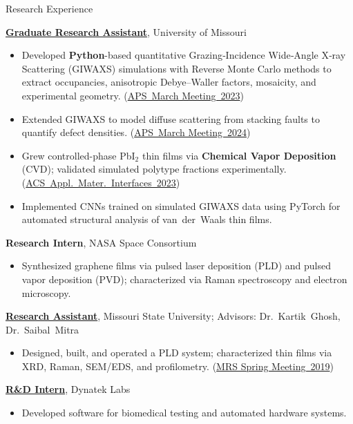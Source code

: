 \begin{rubric}{Research Experience}

  \entry*[2021--Present]%
  \textbf{\href{https://physics.missouri.edu/news/celebrating-student-awards-scholarships-and-recognition}{Graduate Research Assistant}}, University of Missouri%
  \begin{itemize}
    \item Developed \textbf{Python}-based quantitative Grazing‑Incidence Wide‑Angle X‑ray Scattering (GIWAXS) simulations with Reverse Monte Carlo methods to extract occupancies, anisotropic Debye–Waller factors, mosaicity, and experimental geometry. (\href{https://www.researchgate.net/publication/377264935_Quantifying_Orientational_Order_of_PbI2_van_der_Waals_Films_with_X-ray_Diffraction_using_an_Area_Detector}{APS March Meeting 2023})
    \item Extended GIWAXS to model diffuse scattering from stacking faults to quantify defect densities. (\href{https://meetings.aps.org/Meeting/MAR24/Session/S64.3}{APS March Meeting 2024})
    \item Grew controlled-phase PbI$_2$ thin films via \textbf{Chemical Vapor Deposition} (CVD); validated simulated polytype fractions experimentally. (\href{https://doi.org/10.1021/acsami.3c14559}{ACS Appl. Mater. Interfaces 2023})
    \item Implemented CNNs trained on simulated GIWAXS data using PyTorch for automated structural analysis of van der Waals thin films. 
  \end{itemize}

  \entry*[2019--2020]%
  \textbf{Research Intern}, NASA Space Consortium%
  \begin{itemize}
    \item Synthesized graphene films via pulsed laser deposition (PLD) and pulsed vapor deposition (PVD); characterized via Raman spectroscopy and electron microscopy.
  \end{itemize}

  \entry*[2017--2020]%
  \textbf{\href{https://www.mrs.org/meetings-events/annual-meetings/archive/profile/David-Beckwitt-}{Research Assistant}}, Missouri State University; Advisors: Dr. Kartik Ghosh, Dr. Saibal Mitra%
  \begin{itemize}
    \item Designed, built, and operated a PLD system; characterized thin films via XRD, Raman, SEM/EDS, and profilometry. (\href{https://www.mrs.org/meetings-events/annual-meetings/archive/profile/David-Beckwitt-}{MRS Spring Meeting 2019})
  \end{itemize}

  \entry*[2019]%
  \textbf{\href{https://dynateklabs.com}{R\&D Intern}}, Dynatek Labs%
  \begin{itemize}
    \item Developed software for biomedical testing and automated hardware systems.
  \end{itemize}
\end{rubric}
